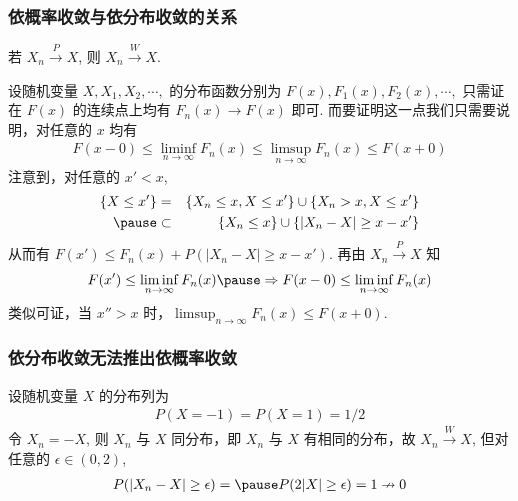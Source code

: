 \documentclass[Prob-All.tex]{subfiles}
\begin{document}
\begin{frame}
	\frametitle{依概率收敛与依分布收敛的关系}
	\begin{thm}
		若 $X_n\stackrel{P}{\rightarrow} X$, 则 $X_n\stackrel{W}{\rightarrow} X$.
	\end{thm}

	\pause \zheng 设随机变量 $X,X_1, X_2,\cdots,$ 的分布函数分别为 $F (x), F_1 (x),F_2 (x),\cdots,$ \pause 只需证在 $F (x)$ 的连续点上均有 $F_n (x)\rightarrow F (x)$ 即可. \pause 而要证明这一点我们只需要说明，对任意的 $x$ 均有
	\begin{eqnarray*}
		F(x-0)\le \liminf_{n\rightarrow\infty} F_n(x)\le \limsup_{n\rightarrow\infty} F_n(x)\le F(x+0)
	\end{eqnarray*}
	\pause 注意到，对任意的 $x'<x$,
	\begin{eqnarray*}
		\{X\le x'\}&=&\{X_n\le x, X\le x'\}\cup\{X_n>x,X\le x'\}\\
		\pause &\subset&\{X_n\le x\}\cup\{|X_n-X|\ge x-x'\}
	\end{eqnarray*}
	\pause 从而有 $F (x')\le F_n (x)+P (|X_n-X|\ge x-x')$. \pause 再由 $X_n\stackrel{P}{\rightarrow} X$ 知
	\pause \begin{eqnarray*}
		F(x')\le \liminf_{n\rightarrow\infty}F_n(x) \pause \Rightarrow F(x-0)\le \liminf_{n\rightarrow\infty}F_n(x)
	\end{eqnarray*}
	\pause 类似可证，当 $x''>x$ 时，$\limsup_{n\rightarrow\infty} F_n (x)\le F (x+0)$.
\end{frame}
\begin{frame}
	\frametitle{依分布收敛无法推出依概率收敛}
	\begin{exam}
		设随机变量 $X$ 的分布列为
		\begin{eqnarray*}
			P(X=-1)=P(X=1)=1/2
		\end{eqnarray*}
		令 $X_n=-X$, 则 $X_n$ 与 $X$ 同分布，即 $X_n$ 与 $X$ 有相同的分布，故 $X_n\stackrel{W}{\rightarrow} X$, \pause 但对任意的 $\epsilon\in (0,2)$,\pause
		\begin{eqnarray*}
			P(|X_n-X|\ge \epsilon)=\pause P(2|X|\ge \epsilon)=1\nrightarrow 0
		\end{eqnarray*}

	\end{exam}

\end{frame}
\end{document}
